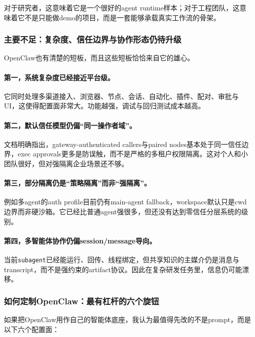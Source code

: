 \documentclass[12pt,a4paper]{article}
\begin{document}
对于研究者，这意味着它是一个很好的agent runtime样本；对于工程团队，这意味着它不是只能做demo的项目，而是一套能够承载真实工作流的骨架。

\subsubsection{主要不足：复杂度、信任边界与协作形态仍待升级}

OpenClaw也有清楚的短板，而且这些短板恰恰来自它的雄心。

\paragraph{第一，系统复杂度已经接近平台级。}
它同时处理多渠道接入、浏览器、节点、会话、自动化、插件、配对、审批与UI，这使得配置面非常大。功能越强，调试与回归测试成本越高。

\paragraph{第二，默认信任模型仍偏“同一操作者域”。}
文档明确指出，gateway-authenticated callers与paired nodes基本处于同一信任边界，exec approvals更多是防误触，而不是严格的多租户权限隔离。这对个人和小团队很好，但对强隔离企业场景还不够。

\paragraph{第三，部分隔离仍是“策略隔离”而非“强隔离”。}
例如多agent的auth profile目前仍有main-agent fallback，workspace默认只是cwd边界而非硬沙箱。它已经比普通agent强很多，但还没有达到零信任分层系统的级别。

\paragraph{第四，多智能体协作仍偏session/message导向。}
当前\texttt{subagent}已经能运行、回传、线程绑定，但共享知识的主媒介仍是消息与transcript，而不是强约束的artifact协议。因此在复杂研发任务里，信息仍可能漂移。

\subsubsection{如何定制OpenClaw：最有杠杆的六个旋钮}

如果把OpenClaw用作自己的智能体底座，我认为最值得先改的不是prompt，而是以下六个配置面：
\end{document}
